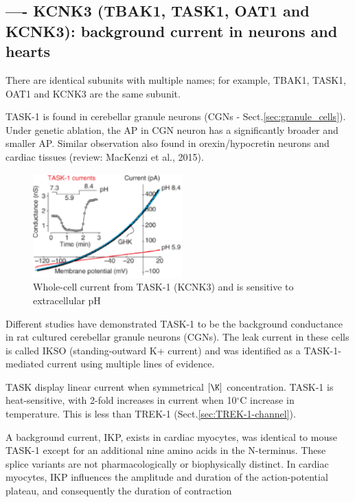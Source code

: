 \subsection{---- KCNK3 (TBAK1, TASK1, OAT1 and KCNK3): background current
in neurons and hearts}
\label{sec:KCNK3}
\label{sec:TASK1}
\label{sec:OAT1}
\label{sec:TBAK1}

There are identical subunits with multiple names; for example, TBAK1,
TASK1, OAT1 and KCNK3 are the same subunit.

TASK-1 is found in cerebellar granule neurons (CGNs -
Sect.\ref{sec:granule_cells}). Under genetic ablation, the AP in CGN neuron has
a significantly broader and smaller AP.  Similar observation also found in
orexin/hypocretin neurons and cardiac tissues (review: MacKenzi et al., 2015).
  
\begin{figure}[hbt]
  \centerline{\includegraphics[height=4cm,
    angle=0]{./images/KCNK3_TASK-1.eps}}
  \caption{Whole-cell current from TASK-1 (KCNK3) and is sensitive to
  extracellular pH}
\label{fig:KCNK3_TASK-1}
\end{figure}

Different studies have demonstrated TASK-1 to be the background conductance in
rat cultured cerebellar granule neurons (CGNs). The leak current in these cells
is called IKSO (standing-outward K+ current) and  was identified as a
TASK-1-mediated current using multiple lines of evidence.

TASK display linear current when symmetrical $[\K]$ concentration. 
TASK-1 is heat-sensitive, with 2-fold increases in current when 10$^\circ$C
increase in temperature. This is less than TREK-1
(Sect.\ref{sec:TREK-1-channel}).

A background current, IKP, exists in cardiac myocytes, 
was identical to mouse TASK-1 except for an additional nine amino acids in the
N-terminus. These splice variants are not pharmacologically or biophysically
distinct. In cardiac myocytes, IKP influences the amplitude and duration of the
action-potential plateau, and consequently the duration of contraction


